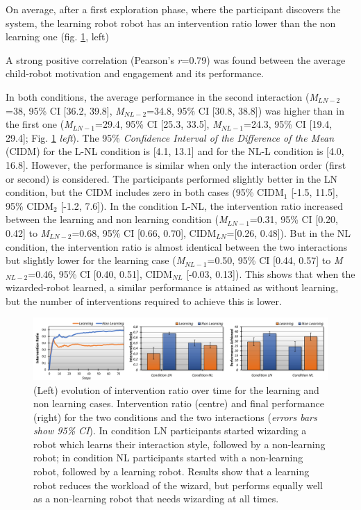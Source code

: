 On average, after a first exploration phase, where the participant discovers the system, 
the learning robot robot has an intervention ratio lower than the non learning one (fig. \ref{fig:graphs}, left)


A strong positive correlation (Pearson's \textit{r}=0.79) was found between the average child-robot motivation and engagement and its performance. 

In both conditions, the average performance in the second interaction (\textit{M$_{LN-2}$} =38, 95\% CI [36.2, 39.8], \textit{M$_{NL-2}$}=34.8, 95\% CI [30.8, 38.8]) was higher than in the first one (\textit{M$_{LN-1}$}=29.4, 95\% CI [25.3, 33.5], \textit{M$_{NL-1}$}=24.3, 95\% CI [19.4, 29.4]; Fig. \ref{fig:graphs} \textit{left}). The 95\% \textit{Confidence Interval of the Difference of the Mean} (CIDM) for the L-NL condition is [4.1, 13.1] and for the NL-L condition is [4.0, 16.8].
However, the performance is similar when only the interaction order (first or second) is considered. 
The participants performed slightly better in the LN condition, but the CIDM includes zero in both cases (95\% CIDM$_{1}$ [-1.5, 11.5], 95\% CIDM$_{2}$ [-1.2, 7.6]). 
In the condition L-NL, the intervention ratio increased between the learning and non learning condition (\textit{M$_{LN-1}$}=0.31, 95\% CI [0.20, 0.42] to \textit{M$_{LN-2}$}=0.68, 95\% CI [0.66, 0.70], CIDM$_{LN}$=[0.26, 0.48]). 
But in the NL condition, the intervention ratio is almost identical between the two interactions but slightly lower for the learning case (\textit{M$_{NL-1}$}=0.50, 95\% CI [0.44, 0.57] to \textit{M$_{NL-2}$}=0.46, 95\% CI [0.40, 0.51], CIDM$_{NL}$ [-0.03, 0.13]).
This shows that when the wizarded-robot learned, a similar performance is attained as without learning, but the number of interventions required to achieve this is lower.

\begin{figure}[t!]
	\centering
	\includegraphics[width=1.\textwidth]{./images/woz_graph_data.png}
	\caption{(Left) evolution of intervention ratio over time for the learning and non learning cases. Intervention ratio (centre) and final performance (right) for the two conditions and the two interactions (\textit{errors bars show 95\% CI}). In condition LN participants started wizarding a robot which learns their interaction style, followed by a non-learning robot; in condition NL participants started with a non-learning robot, followed by a learning robot. Results show that a learning robot reduces the workload of the wizard, but performs equally well as a non-learning robot that needs wizarding at all times.}
	\label{fig:graphs}
\end{figure}

